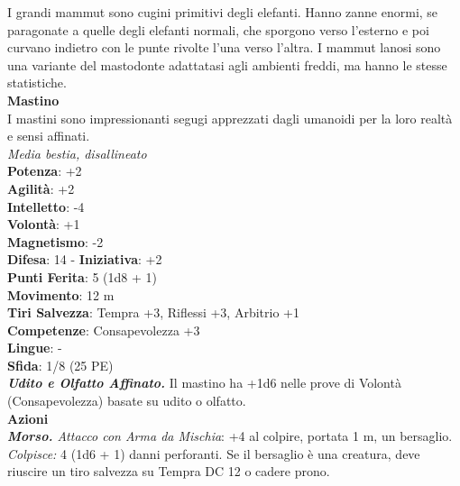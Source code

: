 \begin{multicols}{2}
I grandi mammut sono cugini primitivi degli elefanti. Hanno zanne enormi, se paragonate a quelle degli elefanti normali, che sporgono verso l’esterno e poi curvano indietro con le punte rivolte l’una verso l’altra. I mammut lanosi sono una variante del mastodonte adattatasi agli ambienti freddi, ma hanno le stesse statistiche. \\

\medskip\textbf{Mastino}\\
I mastini sono impressionanti segugi apprezzati dagli umanoidi per la loro realtà e sensi affinati.\\
\emph{Media bestia, disallineato}\\
\textbf{Potenza}: +2\\
\textbf{Agilità}: +2\\
\textbf{Intelletto}: -4\\
\textbf{Volontà}: +1\\
\textbf{Magnetismo}: -2\\
\textbf{Difesa}: 14 - \textbf{Iniziativa}: +2\\
\textbf{Punti Ferita}: 5 (1d8 + 1)\\
\textbf{Movimento}: 12 m\\
\textbf{Tiri Salvezza}: Tempra +3, Riflessi +3, Arbitrio +1 \\
\textbf{Competenze}: Consapevolezza +3\\
\textbf{Lingue}: -\\
\textbf{Sfida}: 1/8 (25 PE)\smallskip\\
\emph{\textbf{Udito e Olfatto Affinato.}} Il mastino ha +1d6 nelle prove di Volontà (Consapevolezza) basate su udito o olfatto.\\
\smallskip\textbf{Azioni}\\
\emph{\textbf{Morso.} Attacco con Arma da Mischia}: +4 al colpire, portata 1 m, un bersaglio.\\
\emph{Colpisce:} 4 (1d6 + 1) danni perforanti. Se il bersaglio è una creatura, deve riuscire un tiro salvezza su Tempra DC  12 o cadere prono.\\


\end{multicols}
